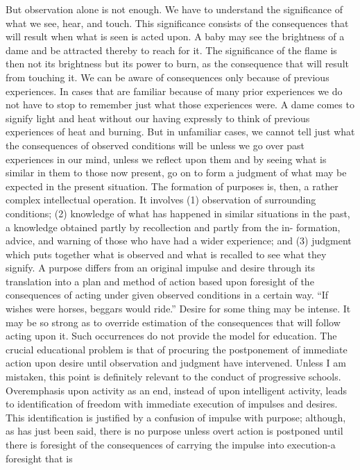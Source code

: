 But observation alone is not enough. We have to understand the significance of what 
we see, hear, and touch. This significance consists of the consequences that will result 
when what is seen is acted upon. A baby may see the brightness of a dame and be 
attracted thereby to reach for it. The significance of the flame is then not its brightness 
but its power to burn, as the consequence that will result from touching it. We can be 
aware of consequences only because of previous experiences. In cases that are familiar 
because of many prior experiences we do not have to stop to remember just what those 
experiences were. A dame comes to signify light and heat without our having expressly 
to think of previous experiences of heat and burning. But in unfamiliar cases, we cannot 
tell just what the consequences of observed conditions will be unless we go over past 
experiences in our mind, unless we reflect upon them and by seeing what is similar in 
them to those now present, go on to form a judgment of what may be expected in the 
present situation. The formation of purposes is, then, a rather complex intellectual 
operation. It involves (1) observation of surrounding conditions; (2) knowledge of what 
has happened in similar situations in the past, a knowledge obtained partly by recollection 
and partly from the in- formation, advice, and warning of those who have had a wider 
experience; and (3) judgment which puts together what is observed and what is recalled 
to see what they signify. A purpose differs from an original impulse and desire through 
its translation into a plan and method of action based upon foresight of the consequences 
of acting under given observed conditions in a certain way. \enquote{If wishes were horses, 
beggars would ride.} Desire for some thing may be intense. It may be so strong as to 
override estimation of the consequences that will follow acting upon it. Such occurrences 
do not provide the model for education. The crucial educational problem is that of procuring the postponement of immediate action upon desire until observation and judgment 
have intervened. Unless I am mistaken, this point is definitely relevant to the conduct of 
progressive schools. Overemphasis upon activity as an end, instead of upon intelligent 
activity, leads to identification of freedom with immediate execution of impulses and 
desires. This identification is justified by a confusion of impulse with purpose; although, 
as has just been said, there is no purpose unless overt action is postponed until there is 
foresight of the consequences of carrying the impulse into execution-a foresight that is 
